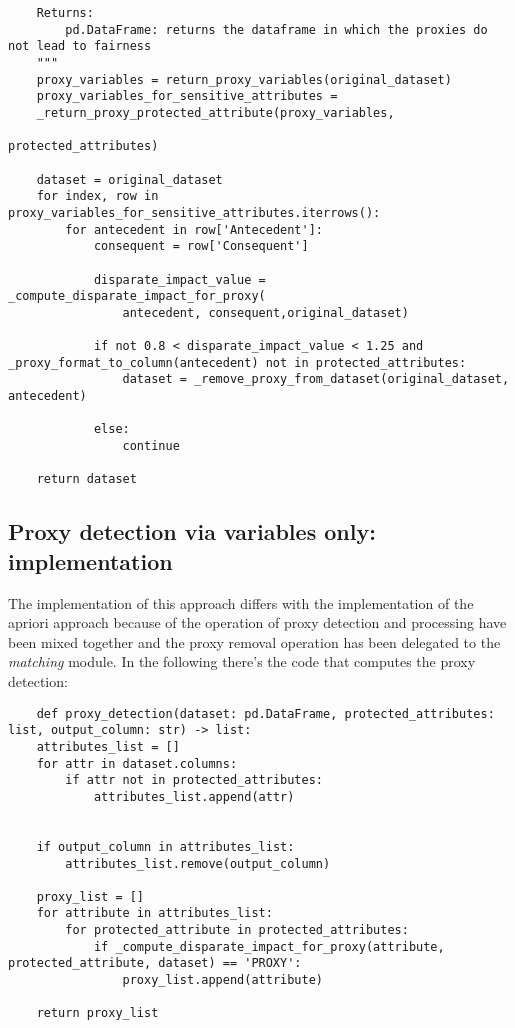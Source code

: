 \documentclass[12pt,a4paper,openright,twoside]{book}
\begin{document}
\begin{enumerate}
\begin{lstlisting}
    Returns:
        pd.DataFrame: returns the dataframe in which the proxies do not lead to fairness
    """
    proxy_variables = return_proxy_variables(original_dataset)
    proxy_variables_for_sensitive_attributes = 
    _return_proxy_protected_attribute(proxy_variables,
                                                                                 protected_attributes)
    
    dataset = original_dataset
    for index, row in proxy_variables_for_sensitive_attributes.iterrows():
        for antecedent in row['Antecedent']:
            consequent = row['Consequent']

            disparate_impact_value = _compute_disparate_impact_for_proxy(
                antecedent, consequent,original_dataset)

            if not 0.8 < disparate_impact_value < 1.25 and _proxy_format_to_column(antecedent) not in protected_attributes:
                dataset = _remove_proxy_from_dataset(original_dataset, antecedent)

            else:
                continue

    return dataset

    \end{lstlisting}
\end{enumerate}

\subsection{Proxy detection via variables only: implementation}
The implementation of this approach differs with the implementation of the apriori approach because of the operation of proxy detection and processing have been mixed together and the proxy removal operation has been delegated to the \emph{matching} module. In the following there's the code that computes the proxy detection:
\begin{lstlisting}
    def proxy_detection(dataset: pd.DataFrame, protected_attributes: list, output_column: str) -> list:
    attributes_list = []
    for attr in dataset.columns:
        if attr not in protected_attributes:
            attributes_list.append(attr)
            
          
    if output_column in attributes_list:
        attributes_list.remove(output_column)
        
    proxy_list = []
    for attribute in attributes_list:
        for protected_attribute in protected_attributes:
            if _compute_disparate_impact_for_proxy(attribute, protected_attribute, dataset) == 'PROXY':
                proxy_list.append(attribute)

    return proxy_list

\end{lstlisting}
\end{document}
